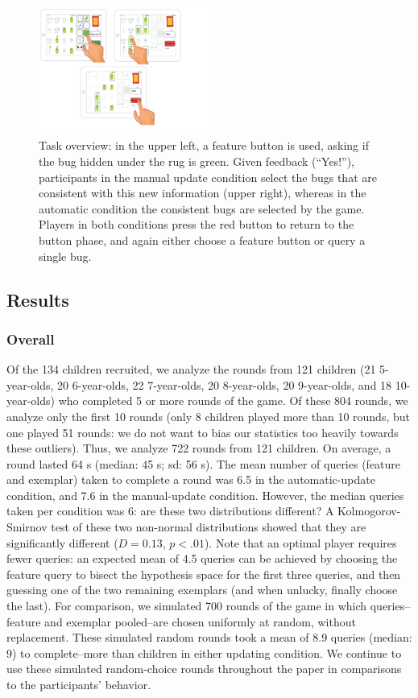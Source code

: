 \documentclass[10pt,letterpaper]{article}
\begin{document}
\begin{figure}[!h]
  \centering
  \includegraphics[width=0.5\textwidth]{figures/task_overview}
  \caption{Task overview: in the upper left, a feature button is used, asking if the bug hidden under the rug is green. Given feedback (``Yes!''), participants in the manual update condition select the bugs that are consistent with this new information (upper right), whereas in the automatic condition the consistent bugs are selected by the game. Players in both conditions press the red button to return to the button phase, and again either choose a feature button or query a single bug.}
  \label{fig:task-overview}
\end{figure} 


\subsection{Results}

\subsubsection{Overall}

Of the 134 children recruited, we analyze the rounds from 121 children (21 5-year-olds, 20 6-year-olds, 22 7-year-olds, 20 8-year-olds, 20 9-year-olds, and 18 10-year-olds) who completed 5 or more rounds of the game. Of these 804 rounds, we analyze only the first 10 rounds (only 8 children played more than 10 rounds, but one played 51 rounds: we do not want to bias our statistics too heavily towards these outliers). Thus, we analyze 722 rounds from 121 children. On average, a round lasted 64 s (median: 45 s; sd: 56 s). The mean number of queries (feature and exemplar) taken to complete a round was 6.5 in the automatic-update condition, and 7.6 in the manual-update condition. However, the median queries taken per condition was 6: are these two distributions different? A Kolmogorov-Smirnov test of these two non-normal distributions showed that they are significantly different ($D = 0.13$, $p<.01$). Note that an optimal player requires fewer queries: an expected mean of 4.5 queries can be achieved by choosing the feature query to bisect the hypothesis space for the first three queries, and then guessing one of the two remaining exemplars (and when unlucky, finally choose the last). For comparison, we simulated 700 rounds of the game in which queries--feature and exemplar pooled--are chosen uniformly at random, without replacement. These simulated random rounds took a mean of 8.9 queries (median: 9) to complete--more than children in either updating condition. We continue to use these simulated random-choice rounds throughout the paper in comparisons to the participants' behavior.
\end{document}
